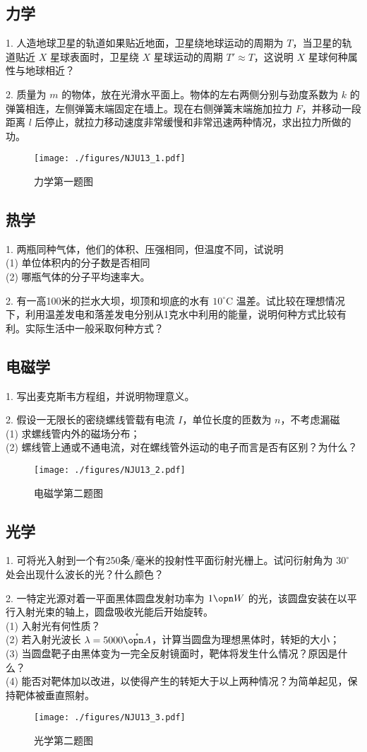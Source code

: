 \subsection{力学}
1. 人造地球卫星的轨道如果贴近地面，卫星绕地球运动的周期为 $T$，当卫星的轨道贴近 $X$ 星球表面时，卫星绕 $X$ 星球运动的周期 $T' \approx T$，这说明 $X$ 星球何种属性与地球相近？

2. 质量为 $m$ 的物体，放在光滑水平面上。物体的左右两侧分别与劲度系数为 $k$ 的弹簧相连，左侧弹簧末端固定在墙上。现在右侧弹簧末端施加拉力 $F$，并移动一段距离 $l$ 后停止，就拉力移动速度非常缓慢和非常迅速两种情况，求出拉力所做的功。
\begin{figure}[ht]
\centering
\texttt{[image: ./figures/NJU13\_1.pdf]}
\caption{力学第一题图} \label{NJU13_fig1}
\end{figure}
\subsection{热学}
1. 两瓶同种气体，他们的体积、压强相同，但温度不同，试说明\\
(1) 单位体积内的分子数是否相同\\
(2) 哪瓶气体的分子平均速率大。

2. 有一高100米的拦水大坝，坝顶和坝底的水有 $10^\circ\mathrm{C}$ 温差。试比较在理想情况下，利用温差发电和落差发电分别从1克水中利用的能量，说明何种方式比较有利。实际生活中一般采取何种方式？
\subsection{电磁学}
1. 写出麦克斯韦方程组，并说明物理意义。

2. 假设一无限长的密绕螺线管载有电流 $I$，单位长度的匝数为 $n$，不考虑漏磁\\
(1) 求螺线管内外的磁场分布；\\
(2) 螺线管上通或不通电流，对在螺线管外运动的电子而言是否有区别？为什么？
\begin{figure}[ht]
\centering
\texttt{[image: ./figures/NJU13\_2.pdf]}
\caption{电磁学第二题图} \label{NJU13_fig2}
\end{figure}
\subsection{光学}
1. 可将光入射到一个有250条/毫米的投射性平面衍射光栅上。试问衍射角为 $30^\circ$ 处会出现什么波长的光？什么颜色？

2. 一特定光源对着一平面黑体圆盘发射功率为 $1\opn W$ 的光，该圆盘安装在以平行入射光束的轴上，圆盘吸收光能后开始旋转。\\
(1) 入射光有何性质？\\
(2) 若入射光波长 $\lambda=5000 \mathring{\opn A}$，计算当圆盘为理想黑体时，转矩的大小；\\
(3) 当圆盘靶子由黑体变为一完全反射镜面时，靶体将发生什么情况？原因是什么？\\
(4) 能否对靶体加以改进，以使得产生的转矩大于以上两种情况？为简单起见，保持靶体被垂直照射。
\begin{figure}[ht]
\centering
\texttt{[image: ./figures/NJU13\_3.pdf]}
\caption{光学第二题图} \label{NJU13_fig3}
\end{figure}
